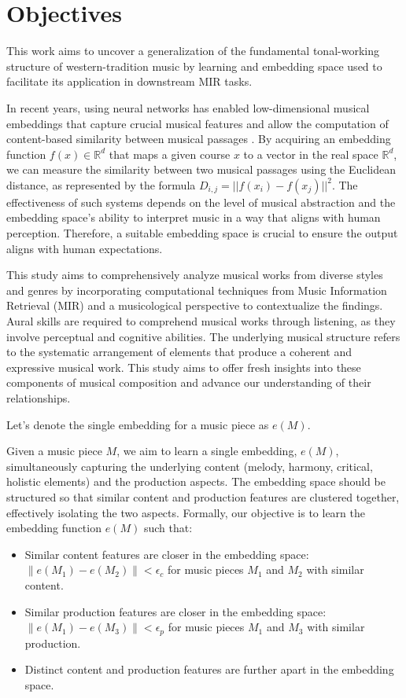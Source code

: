 \section{Objectives}

This work aims to uncover a generalization of the fundamental tonal-working structure of western-tradition music by learning and embedding space used to facilitate its application in downstream MIR tasks.

In recent years, using neural networks has enabled low-dimensional musical embeddings that capture crucial musical features and allow the computation of content-based similarity between musical passages \cite{KimLEARNINGLOSS}\cite{Hung2022Feature-informedClassification}. By acquiring an embedding function $f(x) \in \mathbb{R}^d$ that maps a given course $x$ to a vector in the real space $\mathbb{R}^d$, we can measure the similarity between two musical passages using the Euclidean distance, as represented by the formula $D_{i,j} = ||f(x_i) - f(x_j)||^2$. The effectiveness of such systems depends on the level of musical abstraction and the embedding space's ability to interpret music in a way that aligns with human perception. Therefore, a suitable embedding space is crucial to ensure the output aligns with human expectations.

This study aims to comprehensively analyze musical works from diverse styles and genres by incorporating computational techniques from Music Information Retrieval (MIR) and a musicological perspective to contextualize the findings. Aural skills are required to comprehend musical works through listening, as they involve perceptual and cognitive abilities. The underlying musical structure refers to the systematic arrangement of elements that produce a coherent and expressive musical work. This study aims to offer fresh insights into these components of musical composition and advance our understanding of their relationships.

Let's denote the single embedding for a music piece as $e(M)$.

Given a music piece $M$, we aim to learn a single embedding, $e(M)$, simultaneously capturing the underlying content (melody, harmony, critical, holistic elements) and the production aspects. The embedding space should be structured so that similar content and production features are clustered together, effectively isolating the two aspects. Formally, our objective is to learn the embedding function $e(M)$ such that:

\begin{itemize}
  \item Similar content features are closer in the embedding space: $\|e(M_1) - e(M_2)\| < \epsilon_c$ for music pieces $M_1$ and $M_2$ with similar content.
  \item Similar production features are closer in the embedding space: $\|e(M_1) - e(M_3)\| < \epsilon_p$ for music pieces $M_1$ and $M_3$ with similar production.
  \item Distinct content and production features are further apart in the embedding space.
\end{itemize}

